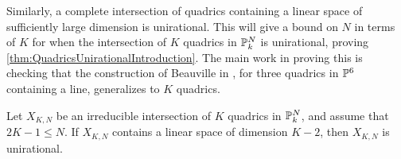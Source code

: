 Similarly, a complete intersection of quadrics containing a linear space of sufficiently large dimension is unirational. This will give a bound on $N$ in terms of $K$ for when the intersection of $K$ quadrics in $\P_k^N$ is unirational, proving \cref{thm:QuadricsUnirationalIntroduction}. The main work in proving this is checking that the construction of Beauville in \cite[1.4.4]{Beauville}, for three quadrics in $\P^6$ containing a line, generalizes to $K$ quadrics. 
\begin{proposition}
  \label{prop:UnirationalFromLinearSpace}
  Let $X_{K,N}$ be an irreducible intersection of $K$ quadrics in $\P_k^N$, and assume that $2K-1 \leq N$. If $X_{K,N}$ contains a linear space of dimension $K-2$, then $X_{K,N}$ is unirational.
\end{proposition}
